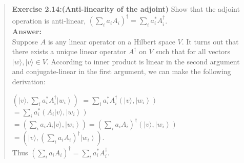 \documentclass[UTF8]{ctexart}
\begin{document}
\begin{quote}
	
\textbf{Exercise 2.14:(Anti-linearity of the adjoint)} Show that the adjoint operation is anti-linear,
	 $\left(\sum_{i} a_{i} A_{i}\right)^{\dagger}=\sum_{i} a_{i}^{*} A_{i}^{\dagger}$. \\  
\textbf{Answer:}\\
	 	 \hspace*{0.6cm}Suppose $A$ is any linear operator on a Hilbert space $V$. It turns out that there exists a unique linear operator $A^{\dagger}$ on $ V$ such that for all vectors $ |w\rangle ,| v\rangle \in V$. 
According to  inner product is linear in the second argument and  conjugate-linear in the first argument, we can make the 	following derivation: 

	$\left(|v\rangle, \sum_{i} a_{i}^{*} A_{i}^{\dagger}\left|w_{i}\right\rangle\right)$ 
	$= \sum_{i} a_{i}^{*}  A_{i}^{\dagger}\left(|v\rangle,\left|w_{i}\right\rangle\right)$  \\
	$=\sum_{i} a_{i}^{*} \left(A_{i}|v\rangle,\left|w_{i}\right\rangle\right)$
	$=\left(\sum_{i} a_{i}A_{i}|v\rangle,\left|w_{i}\right\rangle\right)
	=\left( \sum_{i} a_{i} A_{i}\right)^{\dagger}\left(|v\rangle,\left|w_{i}\right\rangle\right)$
	$=\left(|v\rangle, (\sum_{i} a_{i} A_{i})^{\dagger}\left|w_{i}\right\rangle\right)$.\\
	Thus $(\sum_{i} a_{i} A_{i})^{\dagger}=\sum_{i} a_{i}^{*} A_{i}^{\dagger}$.  \\ 
	

\end{quote}
\end{document}

